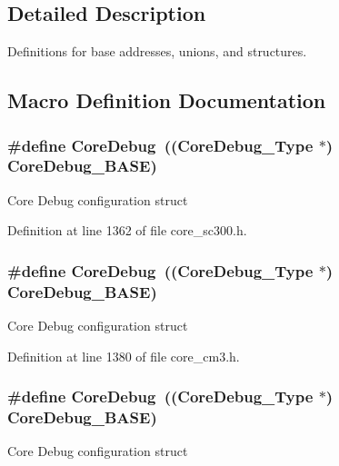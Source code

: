 \subsection{Detailed Description}
Definitions for base addresses, unions, and structures. 



\subsection{Macro Definition Documentation}
\subsubsection[{\texorpdfstring{Core\+Debug}{CoreDebug}}]{\setlength{\rightskip}{0pt plus 5cm}\#define Core\+Debug~(({\bf Core\+Debug\+\_\+\+Type} $\ast$)     {\bf Core\+Debug\+\_\+\+B\+A\+SE})}\hypertarget{group___c_m_s_i_s__core__base_gab6e30a2b802d9021619dbb0be7f5d63d}{}\label{group___c_m_s_i_s__core__base_gab6e30a2b802d9021619dbb0be7f5d63d}
Core Debug configuration struct 

Definition at line 1362 of file core\+\_\+sc300.\+h.

\subsubsection[{\texorpdfstring{Core\+Debug}{CoreDebug}}]{\setlength{\rightskip}{0pt plus 5cm}\#define Core\+Debug~(({\bf Core\+Debug\+\_\+\+Type} $\ast$)     {\bf Core\+Debug\+\_\+\+B\+A\+SE})}\hypertarget{group___c_m_s_i_s__core__base_gab6e30a2b802d9021619dbb0be7f5d63d}{}\label{group___c_m_s_i_s__core__base_gab6e30a2b802d9021619dbb0be7f5d63d}
Core Debug configuration struct 

Definition at line 1380 of file core\+\_\+cm3.\+h.

\subsubsection[{\texorpdfstring{Core\+Debug}{CoreDebug}}]{\setlength{\rightskip}{0pt plus 5cm}\#define Core\+Debug~(({\bf Core\+Debug\+\_\+\+Type} $\ast$)     {\bf Core\+Debug\+\_\+\+B\+A\+SE})}\hypertarget{group___c_m_s_i_s__core__base_gab6e30a2b802d9021619dbb0be7f5d63d}{}\label{group___c_m_s_i_s__core__base_gab6e30a2b802d9021619dbb0be7f5d63d}
Core Debug configuration struct 

